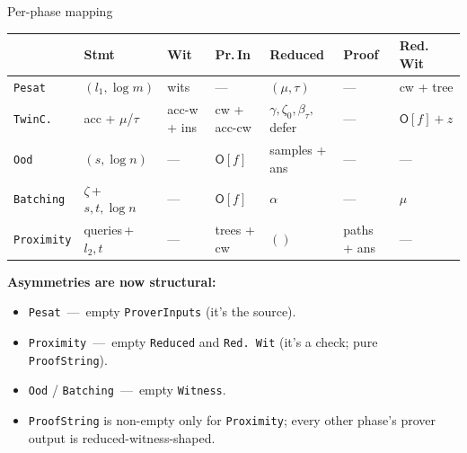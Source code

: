 \documentclass[10pt,aspectratio=169]{beamer}
\begin{document}
\begin{frame}{Per-phase mapping}
\scriptsize
\begin{center}
\begin{tabular}{lp{1.2cm}p{1.0cm}p{1.0cm}p{1.4cm}p{0.9cm}p{1.0cm}}
\toprule
& \textbf{Stmt} & \textbf{Wit} & \textbf{Pr.\,In} & \textbf{Reduced} & \textbf{Proof} & \textbf{Red.\,Wit} \\
\midrule
\texttt{Pesat} & $(l_1, \log m)$ & wits & --- & $(\mu, \tau)$ & --- & cw + tree \\
\texttt{TwinC.} & acc + $\mu$/$\tau$ & acc-w + ins & cw + acc-cw & $\gamma, \zeta_0, \beta_\tau,$ defer & --- & $\mathsf{O}[f] + z$ \\
\texttt{Ood} & $(s, \log n)$ & --- & $\mathsf{O}[f]$ & samples + ans & --- & --- \\
\texttt{Batching} & $\zeta$\,+\,$s,t,\log n$ & --- & $\mathsf{O}[f]$ & $\alpha$ & --- & $\mu$ \\
\texttt{Proximity} & queries\,+\,$l_2,t$ & --- & trees + cw & $()$ & paths + ans & --- \\
\bottomrule
\end{tabular}
\end{center}

\vspace{0.4em}
\textbf{Asymmetries are now structural:}
\begin{itemize}\scriptsize
  \item \texttt{Pesat} \,---\, empty \texttt{ProverInputs} (it's the source).
  \item \texttt{Proximity} \,---\, empty \texttt{Reduced} and \texttt{Red.\,Wit} (it's a check; pure \texttt{ProofString}).
  \item \texttt{Ood} / \texttt{Batching} \,---\, empty \texttt{Witness}.
  \item \texttt{ProofString} is non-empty only for \texttt{Proximity}; every other phase's prover output is reduced-witness-shaped.
\end{itemize}
\end{frame}
\end{document}
